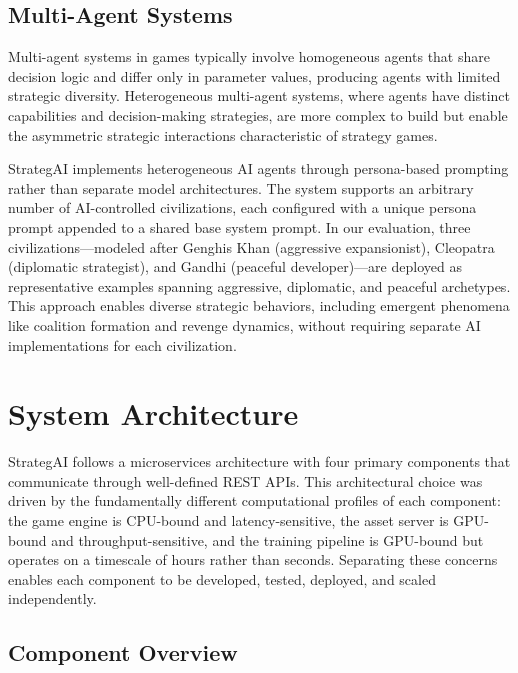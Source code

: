 \documentclass[conference]{IEEEtran}
\begin{document}
\subsection{Multi-Agent Systems}

Multi-agent systems in games typically involve homogeneous agents that share decision logic and differ only in parameter values, producing agents with limited strategic diversity. Heterogeneous multi-agent systems, where agents have distinct capabilities and decision-making strategies, are more complex to build but enable the asymmetric strategic interactions characteristic of strategy games.

StrategAI implements heterogeneous AI agents through persona-based prompting rather than separate model architectures. The system supports an arbitrary number of AI-controlled civilizations, each configured with a unique persona prompt appended to a shared base system prompt. In our evaluation, three civilizations---modeled after Genghis Khan (aggressive expansionist), Cleopatra (diplomatic strategist), and Gandhi (peaceful developer)---are deployed as representative examples spanning aggressive, diplomatic, and peaceful archetypes. This approach enables diverse strategic behaviors, including emergent phenomena like coalition formation and revenge dynamics, without requiring separate AI implementations for each civilization.

\section{System Architecture}
\label{sec:architecture}

StrategAI follows a microservices architecture with four primary components that communicate through well-defined REST APIs. This architectural choice was driven by the fundamentally different computational profiles of each component: the game engine is CPU-bound and latency-sensitive, the asset server is GPU-bound and throughput-sensitive, and the training pipeline is GPU-bound but operates on a timescale of hours rather than seconds. Separating these concerns enables each component to be developed, tested, deployed, and scaled independently.

\subsection{Component Overview}

\end{document}
